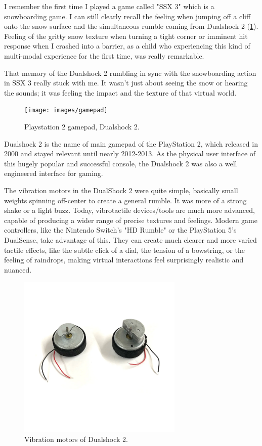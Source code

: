     I remember the first time I played a game called "SSX 3" which is a snowboarding game. I can still clearly recall the feeling when jumping off a cliff onto the snow surface and the simultaneous rumble coming from Dualshock 2 (\ref{fig:DS2}). Feeling of the gritty snow texture when turning a tight corner or imminent hit response when I crashed into a barrier, as a child who experiencing this kind of multi-modal experience for the first time, was really remarkable.\par

    That memory of the Dualshock 2 rumbling in sync with the snowboarding action in SSX 3 really stuck with me. It wasn't just about seeing the snow or hearing the sounds; it was feeling the impact and the texture of that virtual world.

    \begin{figure}[H]
    \centering
    \texttt{[image: images/gamepad]}
    \caption{Playstation 2 gamepad, Dualshock 2.}
    \label{fig:DS2}
    \end{figure}

    Dualshock 2 is the name of main gamepad of the PlayStation 2, which released in 2000 and stayed relevant until nearly 2012-2013. As the physical user interface of this hugely popular and successful console, the Dualshock 2 was also a well engineered interface for gaming.\par

    The vibration motors in the DualShock 2 were quite simple, basically small weights spinning off-center to create a general rumble. It was more of a strong shake or a light buzz\cite{PlayStation_Blogpost}. Today, vibrotactile devices/tools are much more advanced, capable of producing a wider range of precise textures and feelings. Modern game controllers, like the Nintendo Switch's "HD Rumble" or the PlayStation 5's DualSense, take advantage of this. They can create much clearer and more varied tactile effects, like the subtle click of a dial, the tension of a bowstring, or the feeling of raindrops, making virtual interactions feel surprisingly realistic and nuanced.

    \begin{figure}[H]
    \centering
    \includegraphics[width=0.7\textwidth]{images/vibration_motors_ds2}
    \caption{Vibration motors of Dualshock 2.}
    \label{fig:Vib_Motors}
    \end{figure}

